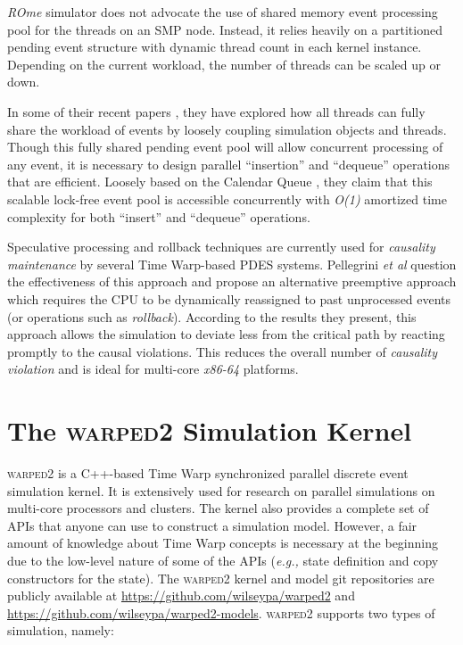 \documentclass[11pt]{book}
\begin{document}
\emph{ROme} simulator does not advocate the use of shared memory event processing pool for the threads on an
SMP node\cite{vitali-12a,vitali-12b}.  Instead, it relies heavily on a partitioned pending event structure
with dynamic thread count in each kernel instance.  Depending on the current workload, the number of threads
can be scaled up or down.

In some of their recent papers \cite{marotta-16a,marotta-16b,ianni-17,marotta-17}, they have explored how all
threads can fully share the workload of events by loosely coupling simulation objects and threads.  Though
this fully shared pending event pool will allow concurrent processing of any event, it is necessary to design
parallel ``insertion'' and ``dequeue'' operations that are efficient.  Loosely based on the Calendar Queue
\cite{brown-88}, they claim that this scalable lock-free event pool is accessible concurrently with
\emph{O(1)} amortized time complexity for both ``insert'' and ``dequeue'' operations.

Speculative processing and rollback techniques are currently used for \emph{causality maintenance} by several
Time Warp-based PDES systems.  Pellegrini \emph{et al} \cite{pellegrini-17} question the effectiveness
of this approach and propose an alternative preemptive approach which requires the CPU to be dynamically
reassigned to past unprocessed events (or operations such as \emph{rollback}). According to the results they
present, this approach allows the simulation to deviate less from the critical path by reacting promptly to
the causal violations.  This reduces the overall number of \emph{causality violation} and is ideal for
multi-core \emph{x86-64} platforms.

\chapter[\textsc{warped2}]{The \textsc{warped2} Simulation Kernel}\label{chapter:warped2_overview}

\textsc{warped2} is a C++-based Time Warp synchronized parallel discrete event simulation kernel.  It is
extensively used for research on parallel simulations on multi-core processors and clusters.  The kernel also
provides a complete set of APIs that anyone can use to construct a simulation model.  However, a fair amount
of knowledge about Time Warp concepts is necessary at the beginning due to the low-level nature of some of the
APIs (\emph{e.g.,} state definition and copy constructors for the state).  The \textsc{warped2} kernel and
model git repositories are publicly available at \url{https://github.com/wilseypa/warped2} and
\url{https://github.com/wilseypa/warped2-models}. \textsc{warped2} supports two types of simulation, namely:
\end{document}
